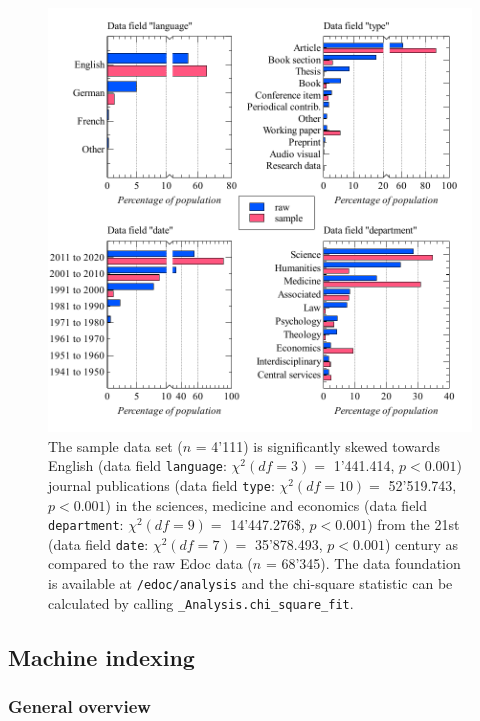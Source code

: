 \begin{figure}
\centering
\includegraphics{images/raw_sample_analysis.pdf}
\caption{The sample data set (\(n\) = 4'111) is significantly skewed
towards English (data field \texttt{language}: \(\chi^2 (df=3) =\)
1'441.414, \(p < 0.001\)) journal publications (data field
\texttt{type}: \(\chi^2 (df=10) =\) 52'519.743, \(p < 0.001\)) in the
sciences, medicine and economics (data field \texttt{department}:
\(\chi^2 (df=9) =\) 14'447.276\$, \(p < 0.001\)) from the 21st (data
field \texttt{date}: \(\chi^2 (df=7) =\) 35'878.493, \(p < 0.001\))
century as compared to the raw Edoc data (\(n\) = 68'345). The data
foundation is available at \texttt{/edoc/analysis} and the chi-square
statistic can be calculated by calling
\texttt{\_Analysis.chi\_square\_fit}.}
\end{figure}

\hypertarget{machine-indexing}{%
\subsection{Machine indexing}\label{machine-indexing}}

\hypertarget{general-overview}{%
\subsubsection{General overview}\label{general-overview}}

